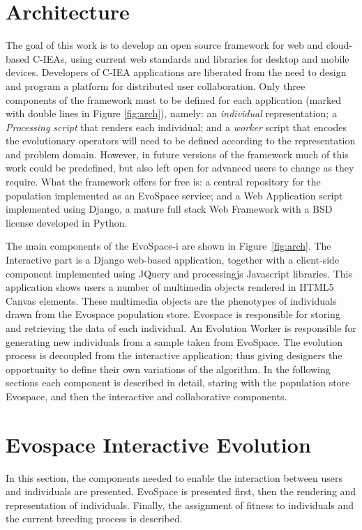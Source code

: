 \documentclass{sig-alternate}
\begin{document}
\section{Architecture}
The goal of this work is to develop an open source framework for web and cloud-based C-IEAs, using current web standards and libraries for desktop and mobile devices.
Developers of C-IEA applications are liberated from the need to design and program a platform for distributed user collaboration.
Only three components of the framework  must to be defined for each
application (marked with double lines in Figure \ref{fig:arch}), namely: an \emph{individual} representation; a \emph{Processing script} that renders each individual; and a \emph{worker} script that encodes the evolutionary operators will need to be defined according to the representation and problem domain.
However, in future versions of the framework much of this work could be predefined, but also left open for advanced users to change as they require.
What the framework offers for free is: a central repository for the population implemented as an EvoSpace service; and a Web Application script implemented using Django, a mature full stack Web Framework with a BSD license developed in Python.


The main components of the EvoSpace-i are shown in Figure~\ref{fig:arch}. The Interactive part is a Django \cite{django} web-based application, together with a client-side component implemented using JQuery and processingjs Javascript libraries. This application shows users a number of multimedia objects rendered in HTML5 Canvas elements. These multimedia objects are the phenotypes of individuals drawn from the Evospace population store. Evospace is responsible for storing and retrieving the data of each individual. An Evolution Worker is responsible for generating new individuals from a sample taken from EvoSpace. The evolution process is decoupled from the interactive application; thus giving designers the opportunity to define their own variations of the algorithm. In the following sections each component is described in detail, staring with the population store Evospace, and then the interactive and collaborative components.



\section{Evospace Interactive Evolution}
In this section, the components needed to enable the interaction between users and individuals are presented. EvoSpace is presented first, then the rendering and representation of individuals. Finally, the assignment of fitness to individuals and the current breeding process is described.
\end{document}
